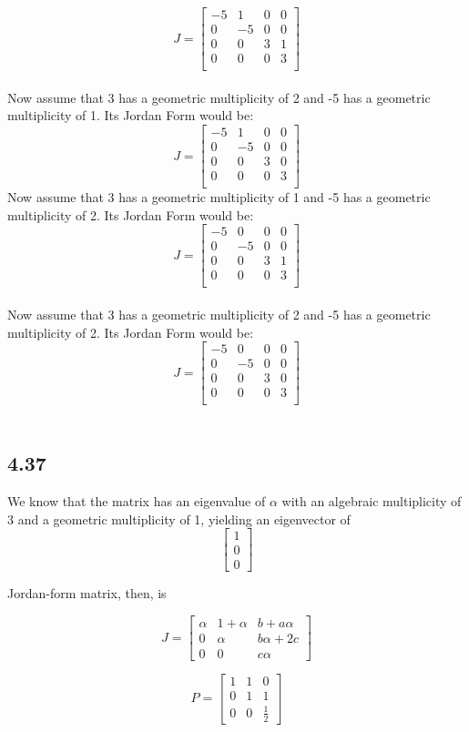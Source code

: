 \documentclass[letterpaper,12pt]{article}
\theoremstyle{definition}
\begin{document}
\[J = \begin{bmatrix}
   -5 & 1 & 0 & 0\\
   0 & -5 & 0 & 0\\
   0 & 0 & 3 & 1\\
   0 & 0 & 0 & 3\\
  \end{bmatrix}\]\\
Now assume that 3 has a geometric multiplicity of 2 and -5 has a geometric multiplicity of 1. Its Jordan Form would be:
\[J = \begin{bmatrix}
   -5 & 1 & 0 & 0\\
   0 & -5 & 0 & 0\\
   0 & 0 & 3 & 0\\
   0 & 0 & 0 & 3\\
  \end{bmatrix}\]
Now assume that 3 has a geometric multiplicity of 1 and -5 has a geometric multiplicity of 2. Its Jordan Form would be:
\[J =\begin{bmatrix}
   -5 & 0 & 0 & 0\\
   0 & -5 & 0 & 0\\
   0 & 0 & 3 & 1\\
   0 & 0 & 0 & 3\\
  \end{bmatrix}\]\\
Now assume that 3 has a geometric multiplicity of 2 and -5 has a geometric multiplicity of 2. Its Jordan Form would be:\\
\[J =\begin{bmatrix}
   -5 & 0 & 0 & 0\\
   0 & -5 & 0 & 0\\
   0 & 0 & 3 & 0\\
   0 & 0 & 0 & 3\\
  \end{bmatrix}\]\\

\subsection*{4.37}

We know that the matrix has an eigenvalue of $\alpha$ with an algebraic multiplicity of 3 and a geometric multiplicity of 1, yielding an eigenvector of 
\[ 
\begin{bmatrix}
    1\\
    0\\
    0
    
\end{bmatrix}\]

Jordan-form matrix, then, is 

\[ 
J = \begin{bmatrix}
    \alpha & 1 + \alpha & b + a\alpha\\
    0 & \alpha & b\alpha + 2c\\
    0 & 0 & c\alpha
    
\end{bmatrix}\]


\[ 
P = \begin{bmatrix}
    1 & 1 & 0\\
    0 & 1 & 1\\
    0 & 0 & \frac{1}{2} 
    
\end{bmatrix}\]
\end{document}
